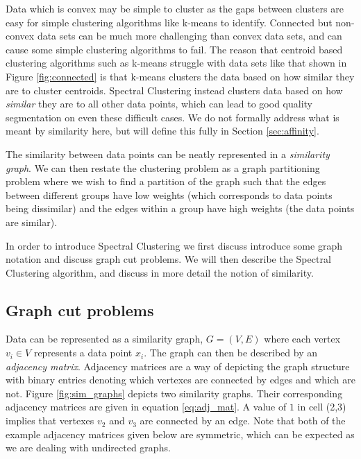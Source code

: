  Data which is convex may be simple to cluster as the gaps between clusters are easy for simple clustering algorithms like k-means to identify. Connected but non-convex data sets can be much more challenging than convex data sets, and can cause some simple clustering algorithms to fail. The reason that centroid based clustering algorithms such as k-means struggle with data sets like that shown in Figure \ref{fig:connected} is that k-means clusters the data based on how similar they are to cluster centroids. Spectral Clustering instead clusters data based on how \textit{similar} they are to all other data points, which can lead to good quality segmentation on even these difficult cases.  We do not formally address what is meant by similarity here, but will define this fully in Section \ref{sec:affinity}.

The similarity between data points can be neatly represented in a \textit{similarity graph}.  We can then restate the clustering problem as a graph partitioning problem where we wish to find a partition of the graph such that the edges between different groups have low weights (which corresponds to data points being dissimilar) and the edges within a group have high weights (the data points are similar).

In order to introduce Spectral Clustering we first discuss introduce some graph notation and discuss graph cut problems. We will then describe the Spectral Clustering algorithm, and discuss in more detail the notion of similarity. 

\subsection{Graph cut problems} 

Data can be represented as a similarity graph, $G = (V,E)$ where each vertex $v_i \in V$ represents a data point $x_i$. The graph can then be described by an \textit{adjacency matrix}. Adjacency matrices are a way of depicting the graph structure with binary entries denoting which vertexes are connected by edges and which are not. Figure \ref{fig:sim_graphs} depicts two similarity graphs. Their corresponding adjacency matrices are given in equation \eqref{eq:adj_mat}.  A  value of $1$ in cell (2,3) implies that vertexes $v_2$ and $v_3$ are connected by an edge. Note that both of the example adjacency matrices given below are symmetric, which can be expected as we are dealing with undirected graphs.

